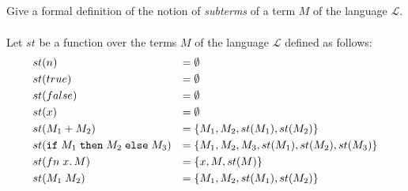 \subsection{}

Give a formal definition of the notion of \emph{subterms} of a term $M$ of the language $\mathcal{L}$.\\\\
Let $st$ be a function over the terms $M$ of the language $\mathcal{L}$ defined as follows:
\begin{align*}
	 & st(n)                  & =\; & \emptyset                                      \\
	 & st(true)               & =\; & \emptyset                                      \\
	 & st(false)              & =\; & \emptyset                                      \\
	 & st(x)                  & =\; & \emptyset                                      \\
	 & st(M_1+M_2)     & =\; & \{ M_1, M_2, st(M_1), st(M_2) \}               \\
	 & st(\texttt{if}\;M_1\;\texttt{then}\;M_2\;\texttt{else}\;M_3) & =\; & \{ M_1, M_2, M_3, st(M_1), st(M_2), st(M_3) \} \\
	 & st(fn\;x.\,M)          & =\; & \{ x, M, st(M) \}                              \\
	 & st(M_1\;M_2)     & =\; & \{ M_1, M_2, st(M_1), st(M_2) \}               \\
\end{align*}

